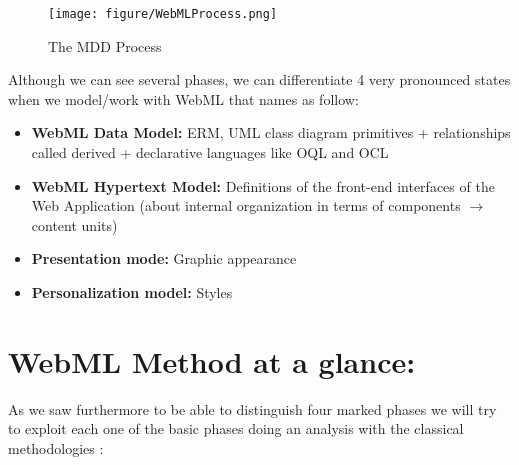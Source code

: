 \documentclass[a4paper]{memoir}
\begin{document}
	\begin{figure}[here]
		\texttt{[image: figure/WebMLProcess.png]}
		\caption{The MDD Process}
		\label{fig:WebML_Process}
	\end{figure}
	
	Although we can see several phases, we can differentiate 4 very pronounced states when we model/work with \ac{WebML} that \cite{Brambilla} names as follow:
	
	\begin{itemize}
		\item \textbf{WebML Data Model:} \ac{ERM}, \ac{UML} class diagram primitives + relationships called derived + declarative languages like \ac{OQL} and \ac{OCL}
		\item \textbf{WebML Hypertext Model:} Definitions of the front-end interfaces of the Web Application (about internal organization in terms of components $\rightarrow$ content units)
		\item \textbf{Presentation mode:} Graphic appearance
		\item \textbf{Personalization model:} Styles
	\end{itemize}

	\section{WebML Method at a glance:}
	As we saw furthermore to be able to distinguish four marked phases we will try to exploit each one of the basic phases doing an analysis with the classical methodologies \cite{Matera2003}\cite{Frattini2007}:
	
\end{document}
